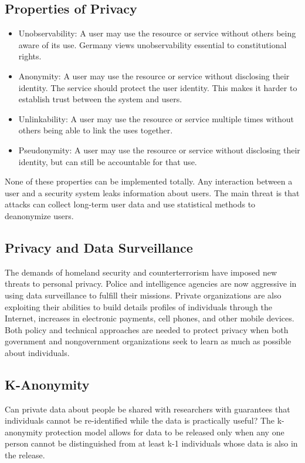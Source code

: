 \documentclass{math}
\begin{document}
\subsection*{Properties of Privacy}
\begin{itemize}
  \item Unobservability: A user may use the resource or service without others
  being aware of its use. Germany views unobservability essential to
  constitutional rights.
  \item Anonymity: A user may use the resource or service without disclosing
  their identity. The service should protect the user identity. This makes
  it harder to establish trust between the system and users.
  \item Unlinkability: A user may use the resource or service multiple times
  without others being able to link the uses together.
  \item Pseudonymity: A user may use the resource or service without disclosing
  their identity, but can still be accountable for that use.
\end{itemize}
None of these properties can be implemented totally. Any interaction between a
user and a security system leaks information about users. The main threat is
that attacks can collect long-term user data and use statistical methods to
deanonymize users.

\subsection*{Privacy and Data Surveillance}
The demands of homeland security and counterterrorism have imposed new threats
to personal privacy. Police and intelligence agencies are now aggressive in
using data surveillance to fulfill their missions. Private organizations are
also exploiting their abilities to build details profiles of individuals
through the Internet, increases in electronic payments, cell phones, and other
mobile devices. Both policy and technical approaches are needed to protect
privacy when both government and nongovernment organizations seek to learn as
much as possible about individuals.

\subsection*{K-Anonymity}
Can private data about people be shared with researchers with guarantees that
individuals cannot be re-identified while the data is practically useful? The
k-anonymity protection model allows for data to be released only when any
one person cannot be distinguished from at least k-1 individuals whose data is
also in the release.
\end{document}
